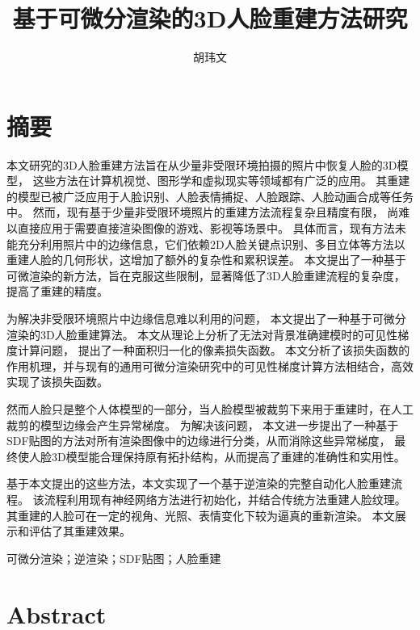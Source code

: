 \documentclass{scutmaster}
\title{基于可微分渲染的3D人脸重建方法研究}
\date{\zhtoday}
\author{胡玮文}
\begin{document}
\maketitle
\hideinblind{
    \maketitleEN
    \nominationpage
    \declareoforiginality
}

\frontmatter
\chapter{摘\texorpdfstring{\quad}{}要}

本文研究的3D人脸重建方法旨在从少量非受限环境拍摄的照片中恢复人脸的3D模型，
这些方法在计算机视觉、图形学和虚拟现实等领域都有广泛的应用。
其重建的模型已被广泛应用于人脸识别、人脸表情捕捉、人脸跟踪、人脸动画合成等任务中。
然而，现有基于少量非受限环境照片的重建方法流程复杂且精度有限，
尚难以直接应用于需要直接渲染图像的游戏、影视等场景中。
具体而言，现有方法未能充分利用照片中的边缘信息，它们依赖2D人脸关键点识别、多目立体等方法以重建人脸的几何形状，这增加了额外的复杂性和累积误差。
本文提出了一种基于可微渲染的新方法，旨在克服这些限制，显著降低了3D人脸重建流程的复杂度，提高了重建的精度。

为解决非受限环境照片中边缘信息难以利用的问题，
本文提出了一种基于可微分渲染的3D人脸重建算法。
本文从理论上分析了无法对背景准确建模时的可见性梯度计算问题，
提出了一种面积归一化的像素损失函数。
本文分析了该损失函数的作用机理，并与现有的通用可微分渲染研究中的可见性梯度计算方法相结合，高效实现了该损失函数。

然而人脸只是整个人体模型的一部分，当人脸模型被裁剪下来用于重建时，在人工裁剪的模型边缘会产生异常梯度。
为解决该问题，
本文进一步提出了一种基于SDF贴图的方法对所有渲染图像中的边缘进行分类，从而消除这些异常梯度，
最终使人脸3D模型能合理保持原有拓扑结构，从而提高了重建的准确性和实用性。

基于本文提出的这些方法，本文实现了一个基于逆渲染的完整自动化人脸重建流程。
该流程利用现有神经网络方法进行初始化，并结合传统方法重建人脸纹理。
其重建的人脸可在一定的视角、光照、表情变化下较为逼真的重新渲染。
本文展示和评估了其重建效果。

 可微分渲染；逆渲染；SDF贴图；人脸重建

\chapter{Abstract}
\end{document}
